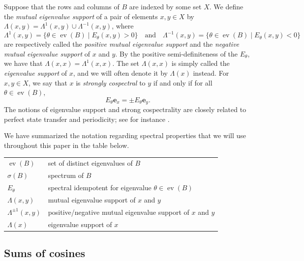 \documentclass{article}
\numberwithin{equation}{section}
\DeclareMathOperator\ev{ev}
\newcommand\Ze{{\mathbf e}}
\begin{document}
Suppose that the rows and columns of $B$ are indexed by some set $X$. We define the \textsl{mutual eigenvalue support} of a pair of elements $x,y \in X$ by $\Lambda(x,y) = \Lambda^1(x,y) \cup \Lambda^{-1}(x,y)$, where
\[
\Lambda^1(x,y) = \{\theta \in \ev(B) \mid E_\theta(x,y) > 0\} \quad \text{and} \quad \Lambda^{-1}(x,y) = \{\theta \in \ev(B) \mid E_\theta(x,y) < 0\}
\]
are respectively called the \textsl{positive mutual eigenvalue support} and the \textsl{negative mutual eigenvalue support} of $x$ and $y$. By the positive semi-definiteness of the $E_\theta$, we have that $\Lambda(x,x) = \Lambda^1(x,x)$. The set $\Lambda(x,x)$ is simply called the \textsl{eigenvalue support} of $x$, and we will often denote it by $\Lambda(x)$ instead. For $x,y\in X$, we say that $x$ is \textsl{strongly cospectral} to $y$ if and only if for all $\theta \in \ev(B)$,
\[
E_\theta \Ze_x = \pm E_\theta\Ze_y.
\]
The notions of eigenvalue support and strong cospectrality are closely related to perfect state transfer and periodicity; see for instance \cite{God2011,GodSmi2024,Zha2019}.

We have summarized the notation regarding spectral properties that we will use throughout this paper in the table below.

\begin{center}
\begin{tabular}{|l|l|}
\hline
$\ev(B)$ & set of distinct eigenvalues of $B$ \\
$\sigma(B)$ & spectrum of $B$ \\
$E_\theta$ & spectral idempotent for eigenvalue $\theta \in \ev(B)$ \\ 
$\Lambda(x,y)$ & mutual eigenvalue support of $x$ and $y$ \\
$\Lambda^{\pm 1}(x,y)$ & positive/negative mutual eigenvalue support of $x$ and $y$ \\
$\Lambda(x)$ & eigenvalue support of $x$ \\
\hline
\end{tabular}
\end{center}


\subsection{Sums of cosines}
\label{sec:prelim-sums_of_cosines}
\end{document}
